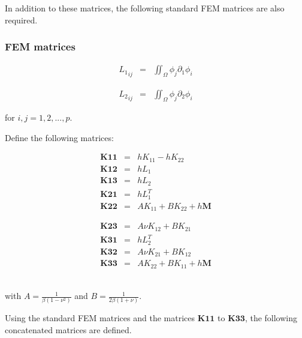 \documentclass[../../main.tex]{subfiles}
\begin{document}
In addition to these matrices, the following standard FEM matrices are also required.

\subsubsection{FEM matrices}
\noindent\begin{minipage}{.5\linewidth}
	\begin{eqnarray*}
		{L_{1}}_{ij} & = & \iint_{\Omega} \phi_j \partial_1\phi_i
	\end{eqnarray*}
\end{minipage}%
\begin{minipage}{.5\linewidth}
	\begin{eqnarray*}
		{L_{2}}_{ij} & = & \iint_{\Omega} \phi_j \partial_2\phi_i
	\end{eqnarray*}
\end{minipage}

for $i,j = 1,2,...,p$.

Define the following matrices:

\noindent\begin{minipage}{.5\linewidth}
	\begin{eqnarray*}
		\mathbf{K11} & = & hK_{11}-hK_{22}\\
		\mathbf{K12} & = & hL_1\\
		\mathbf{K13} & = & hL_2\\
		\mathbf{K21} & = & hL_1^T\\
		\mathbf{K22} & = & AK_{11}+BK_{22}+h\mathbf{M}
	\end{eqnarray*}
\end{minipage}%
\begin{minipage}{0.8\linewidth}
	\begin{eqnarray*}
		\mathbf{K23} & = & A\nu K_{12}+BK_{21}\\
		\mathbf{K31} & = & hL_2^T\\
		\mathbf{K32} & = & A\nu K_{21}+BK_{12}\\
		\mathbf{K33} & = & AK_{22}+BK_{11}+h\mathbf{M}
	\end{eqnarray*}
\end{minipage}\\

with $A = \frac{1}{\beta(1-\nu^2)}$ and $B = \frac{1}{2\beta(1+\nu)}$.

Using the standard FEM matrices and the matrices $\mathbf{K11}$ to $\mathbf{K33}$, the following concatenated matrices are defined.
\end{document}
